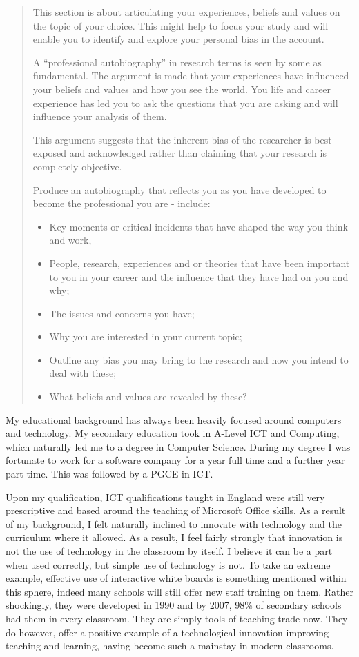 \begin{quote}
This section is about articulating your experiences, beliefs and values on the topic of your choice. This might help to focus your study and will enable you to identify and explore your personal bias in the account. 

A “professional autobiography” in research terms is seen by some as fundamental. The argument is made that your experiences have influenced your beliefs and values and how you see the world. You life and career experience has led you to ask the questions that you are asking and will influence your analysis of them.

This argument suggests that the inherent bias of the researcher is best exposed and acknowledged rather than claiming that your research is completely objective. 

Produce an autobiography that reflects you as you have developed to become the professional you are - include: 
\begin{itemize}
\item Key moments or critical incidents that have shaped the way you think and work, 
\item People, research, experiences and or theories that have been important to you in your career and the influence that they have had on you and why;
\item The issues and concerns you have;
\item Why you are interested in your current topic;
\item Outline any bias you may bring to the research and how you intend to deal with these;
\item What beliefs and values are revealed by these?
\end{itemize}
\end{quote}
My educational background has always been heavily focused around computers and technology. My secondary education took in A-Level ICT and Computing, which naturally led me to a degree in Computer Science. During my degree I was fortunate to work for a software company for a year full time and a further year part time. This was followed by a PGCE in ICT.

Upon my qualification, ICT qualifications taught in England were still very prescriptive and based around the teaching of Microsoft Office skills. As a result of my background, I felt naturally inclined to innovate with technology and the curriculum where it allowed. As a result, I feel fairly strongly that innovation is not the use of technology in the classroom by itself. I believe it can be a part when used correctly, but simple use of technology is not. To take an extreme example, effective use of interactive white boards is something mentioned within this sphere, indeed many schools will still offer new staff training on them. Rather shockingly, they were developed in 1990 and by 2007, 98\% \cite{kitchen2008harnessing} of secondary schools had them in every classroom. They are simply tools of teaching trade now. They do however, offer a positive example of a technological innovation improving teaching and learning, having become such a mainstay in modern classrooms.

